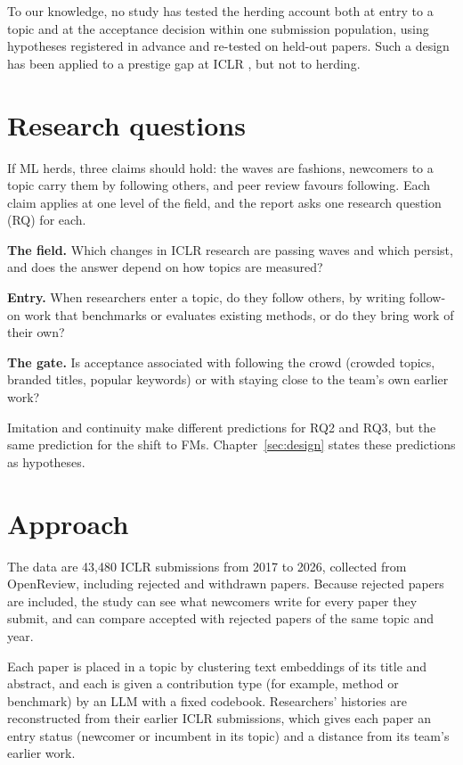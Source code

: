 To our knowledge, no study has tested the herding account both at entry to a topic and at the acceptance decision
within one submission population, using hypotheses registered in advance and re-tested on held-out papers. Such a
design has been applied to a prestige gap at ICLR \citep{ibrahim2026bias}, but not to herding.

\section{Research questions}

If ML herds, three claims should hold: the waves are fashions, newcomers to a topic carry them by following others, and
peer review favours following. Each claim applies at one level of the field, and the report asks one research question
(RQ) for each.

\begin{description}[leftmargin=1.2cm,style=nextline,itemsep=4pt]
\item[RQ1] \textbf{The field.} Which changes in ICLR research are passing waves and which persist, and does the answer
depend on how topics are measured?
\item[RQ2] \textbf{Entry.} When researchers enter a topic, do they follow others, by writing follow-on work that
benchmarks or evaluates existing methods, or do they bring work of their own?
\item[RQ3] \textbf{The gate.} Is acceptance associated with following the crowd (crowded topics, branded titles,
popular keywords) or with staying close to the team's own earlier work?
\end{description}

Imitation and continuity make different predictions for RQ2 and RQ3, but the same prediction for the shift to FMs.
Chapter~\ref{sec:design} states these predictions as hypotheses.

\section{Approach}

The data are 43,480 ICLR submissions from 2017 to 2026, collected from OpenReview, including rejected and withdrawn
papers. Because rejected papers are included, the study can see what newcomers write for every paper they submit, and
can compare accepted with rejected papers of the same topic and year.

Each paper is placed in a topic by clustering text embeddings of its title and abstract, and each is given a
contribution type (for example, method or benchmark) by an LLM with a fixed codebook. Researchers' histories are
reconstructed from their earlier ICLR submissions, which gives each paper an entry status (newcomer or incumbent in its
topic) and a distance from its team's earlier work.

